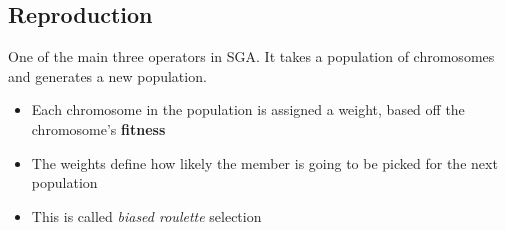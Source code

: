 \documentclass{article}
\providecommand{\tightlist}{%
      \setlength{\itemsep}{0pt}\setlength{\parskip}{0pt}}
\begin{document}
    \subsection{Reproduction}\label{reproduction}

One of the main three operators in SGA. It takes a population of
chromosomes and generates a new population.

\begin{itemize}
\tightlist
\item
  Each chromosome in the population is assigned a weight, based off the
  chromosome's \textbf{fitness}
\item
  The weights define how likely the member is going to be picked for the
  next population
\item
  This is called \emph{biased roulette} selection
\end{itemize}
\end{document}
